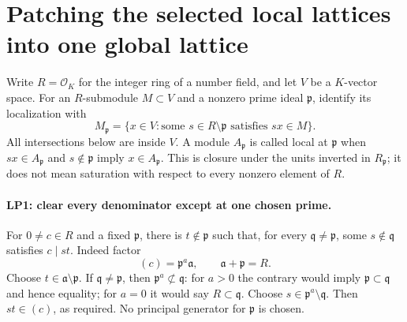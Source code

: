 \section{Patching the selected local lattices into one global lattice}
\label{sec:lattice-patching}


Write $R=\mathcal O_K$ for the integer ring of a number field, and let
$V$ be a $K$-vector space. For an $R$-submodule $M\subset V$ and a
nonzero prime ideal $\mathfrak p$, identify its localization with
\[
 M_{\mathfrak p}=\{x\in V:\text{some }s\in R\setminus\mathfrak p
                                      \text{ satisfies }sx\in M\}.
\]
All intersections below are inside $V$. A module $A_{\mathfrak p}$ is
called local at $\mathfrak p$ when $sx\in A_{\mathfrak p}$ and
$s\notin\mathfrak p$ imply $x\in A_{\mathfrak p}$. This is closure
under the units inverted in $R_{\mathfrak p}$; it does not mean
saturation with respect to every nonzero element of $R$.

\paragraph{LP1: clear every denominator except at one chosen prime.}
For $0\ne c\in R$ and a fixed $\mathfrak p$, there is
$t\notin\mathfrak p$ such that, for every $\mathfrak q\ne\mathfrak p$,
some $s\notin\mathfrak q$ satisfies $c\mid st$.
Indeed factor
\[
                 (c)=\mathfrak p^a\mathfrak a,
                 \qquad\mathfrak a+\mathfrak p=R.
\]
Choose $t\in\mathfrak a\setminus\mathfrak p$. If
$\mathfrak q\ne\mathfrak p$, then
$\mathfrak p^a\not\subset\mathfrak q$: for $a>0$ the contrary
would imply $\mathfrak p\subset\mathfrak q$ and hence equality;
for $a=0$ it would say $R\subset\mathfrak q$.
Choose $s\in\mathfrak p^a\setminus\mathfrak q$. Then
$st\in(c)$, as required. No principal generator for
$\mathfrak p$ is chosen.

